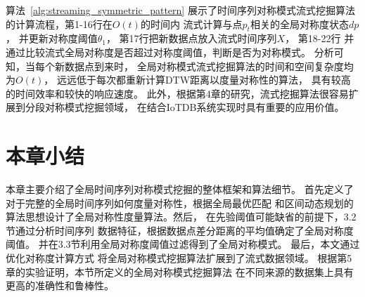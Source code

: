 算法~\ref{alg:streaming_symmetric_pattern}
展示了时间序列对称模式流式挖掘算法
的计算流程，第1-16行在$O(t)$的时间内
流式计算与点$p_t$相关的全局对称度状态$dp$，
并更新对称度阈值$\theta_1$，
第17行把新数据点放入流式时间序列$X$，
第18-22行
并通过比较流式全局对称度是否超过对称度阈值，判断是否为对称模式。
分析可知，当每个新数据点到来时，
全局对称模式流式挖掘算法的时间和空间复杂度均为$O(t)$，
远远低于每次都重新计算DTW距离以度量对称性的算法，
具有较高的时间效率和较快的响应速度。
此外，根据第4章的研究，流式挖掘算法很容易扩展到分段对称模式挖掘领域，
在结合IoTDB系统实现时具有重要的应用价值。

\section{本章小结}
本章主要介绍了全局时间序列对称模式挖掘的整体框架和算法细节。
首先定义了对于完整的全局时间序列如何度量对称性，根据全局最优匹配
和区间动态规划的算法思想设计了全局对称性度量算法。然后，
在先验阈值可能缺省的前提下，3.2节通过分析时间序列
数据特征，根据数据点差分距离的平均值确定了全局对称度阈值。
并在3.3节利用全局对称度阈值过滤得到了全局对称模式。
最后，本文通过优化对称度计算方式
将全局对称模式挖掘算法扩展到了流式数据领域。
根据第5章的实验证明，本节所定义的全局对称模式挖掘算法
在不同来源的数据集上具有更高的准确性和鲁棒性。